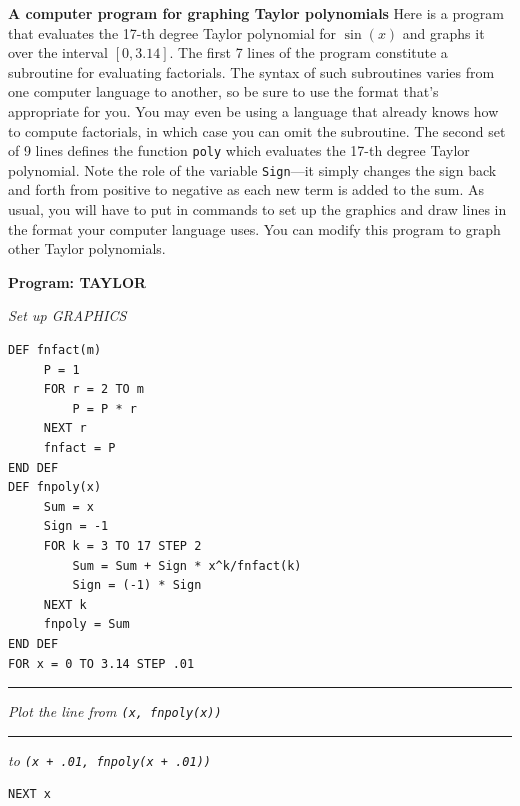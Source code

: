 {{{{\noindent
\begin{center}
\end{center}

\medskip



{\bf A computer program for graphing Taylor polynomials}  Here is a program that evaluates the 17-th degree Taylor polynomial for $\sin(x)$ and graphs it over the interval $[0, 3.14]$.  The first 7 lines of the program constitute a subroutine for evaluating factorials.  The syntax of such subroutines varies from one computer language to another, so be sure to use the format that's appropriate for you.  You may even be using a language that already knows how to compute factorials, in which case you can omit the subroutine.  The second set of 9 lines defines the function {\tt poly} which evaluates the 17-th degree Taylor polynomial.  Note the role of the variable {\tt Sign}---it simply changes the sign back and forth from positive to negative as each new term is added to the sum.  As usual, you will have to put in commands to set up the graphics and draw lines in the format your computer language uses.  You can modify this program to graph other Taylor polynomials.


\begin{center}

{\bf Program: TAYLOR }
\end{center}
\noindent
{\sl Set up GRAPHICS}
\vspace{-7pt}
\begin{verbatim}
DEF fnfact(m)
     P = 1
     FOR r = 2 TO m
         P = P * r
     NEXT r
     fnfact = P
END DEF
DEF fnpoly(x)
     Sum = x
     Sign = -1
     FOR k = 3 TO 17 STEP 2
         Sum = Sum + Sign * x^k/fnfact(k)
         Sign = (-1) * Sign
     NEXT k
     fnpoly = Sum
END DEF
FOR x = 0 TO 3.14 STEP .01
\end{verbatim}
\vspace{-8pt}
\rule{34pt}{0pt} {\sl Plot the line from 
                {\tt (x, fnpoly(x))}}\\[-1pt]
\rule{52pt}{0pt} {\sl to 
                {\tt (x + .01, fnpoly(x + .01))}}\\
\vspace{-30pt}
\begin{verbatim}
NEXT x
\end{verbatim}

}}}}
